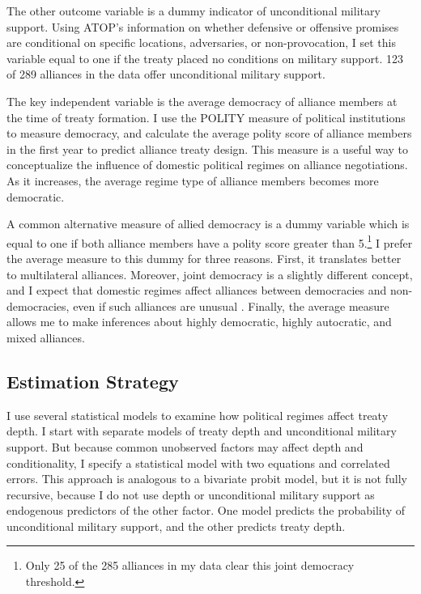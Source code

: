 \documentclass[12pt]{article}
\begin{document}
The other outcome variable is a dummy indicator of unconditional military support. 
Using ATOP's information on whether defensive or offensive promises are conditional on specific locations, adversaries, or non-provocation, I set this variable equal to one if the treaty placed no conditions on military support.
123 of 289 alliances in the data offer unconditional military support. 


The key independent variable is the average democracy of alliance members at the time of treaty formation. 
I use the POLITY measure of political institutions to measure democracy, and calculate the average polity score of alliance members in the first year to predict alliance treaty design. 
This measure is a useful way to conceptualize the influence of domestic political regimes on alliance negotiations. 
As it increases, the average regime type of alliance members becomes more democratic. 


A common alternative measure of allied democracy is a dummy variable which is equal to one if both alliance members have a polity score greater than 5.\footnote{Only 25 of the 285 alliances in my data clear this joint democracy threshold.}
I prefer the average measure to this dummy for three reasons.
First, it translates better to multilateral alliances. 
Moreover, joint democracy is a slightly different concept, and I expect that domestic regimes affect alliances between democracies and non-democracies, even if such alliances are unusual \citep{Leeds1999}.
Finally, the average measure allows me to make inferences about highly democratic, highly autocratic, and mixed alliances. 



\subsection{Estimation Strategy}

I use several statistical models to examine how political regimes affect treaty depth. 
I start with separate models of treaty depth and unconditional military support. 
But because common unobserved factors may affect depth and conditionality, I specify a statistical model with two equations and correlated errors.
This approach is analogous to a bivariate probit model, but it is not fully recursive, because I do not use depth or unconditional military support as endogenous predictors of the other factor. 
One model predicts the probability of unconditional military support, and the other predicts treaty depth.
\end{document}
